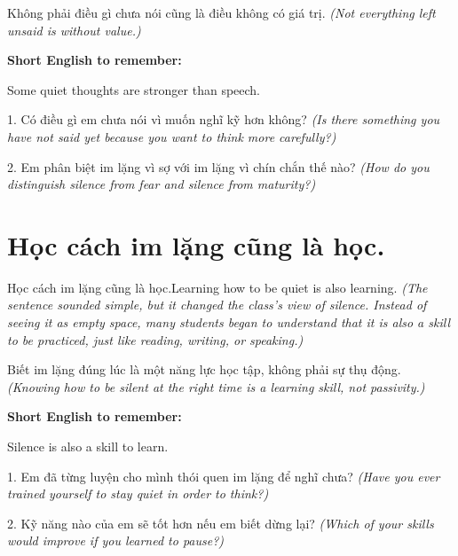 \begin{baihoc}
Không phải điều gì chưa nói cũng là điều không có giá trị.
\textit{(Not everything left unsaid is without value.)}
\end{baihoc}

\begin{ghinhoanh}
\textbf{Short English to remember:}

Some quiet thoughts are stronger than speech.

\end{ghinhoanh}

\begin{tuhocnhanh}
1. Có điều gì em chưa nói vì muốn nghĩ kỹ hơn không? \textit{(Is there something you have not said yet because you want to think more carefully?)}

2. Em phân biệt im lặng vì sợ với im lặng vì chín chắn thế nào? \textit{(How do you distinguish silence from fear and silence from maturity?)}
\end{tuhocnhanh}
\ngancach


\section{Học cách im lặng cũng là học.}
\begin{truyen}{Học cách im lặng cũng là học.}{Learning how to be quiet is also learning.}
\textit{(The sentence sounded simple, but it changed the class's view of silence. Instead of seeing it as empty space, many students began to understand that it is also a skill to be practiced, just like reading, writing, or speaking.)}
\end{truyen}

\begin{baihoc}
Biết im lặng đúng lúc là một năng lực học tập, không phải sự thụ động.
\textit{(Knowing how to be silent at the right time is a learning skill, not passivity.)}
\end{baihoc}

\begin{ghinhoanh}
\textbf{Short English to remember:}

Silence is also a skill to learn.

\end{ghinhoanh}

\begin{tuhocnhanh}
1. Em đã từng luyện cho mình thói quen im lặng để nghĩ chưa? \textit{(Have you ever trained yourself to stay quiet in order to think?)}

2. Kỹ năng nào của em sẽ tốt hơn nếu em biết dừng lại? \textit{(Which of your skills would improve if you learned to pause?)}
\end{tuhocnhanh}
\ngancach


